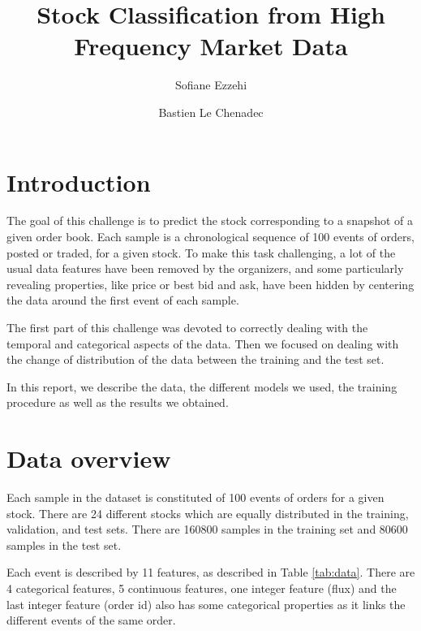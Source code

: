\documentclass[switch, 11pt]{article}
\title{Stock Classification from High Frequency Market Data}
\author[1]{Sofiane Ezzehi}
\author[1]{Bastien Le Chenadec}
\affil[1]{École des Ponts ParisTech, Master MVA}
\begin{document}
\maketitle

\begin{multicols}{2}
    \section{Introduction}

    The goal of this challenge is to predict the stock corresponding to a snapshot of a given order book. Each sample is a chronological sequence of 100 events of orders, posted or traded, for a given stock. To make this task challenging, a lot of the usual data features have been removed by the organizers, and some particularly revealing properties, like price or best bid and ask, have been hidden by centering the data around the first event of each sample.

    The first part of this challenge was devoted to correctly dealing with the temporal and categorical aspects of the data. Then we focused on dealing with the change of distribution of the data between the training and the test set.

    In this report, we describe the data, the different models we used, the training procedure as well as the results we obtained.

    \section{Data overview}

    Each sample in the dataset is constituted of 100 events of orders for a given stock. There are 24 different stocks which are equally distributed in the training, validation, and test sets. There are 160800 samples in the training set and 80600 samples in the test set.

    Each event is described by 11 features, as described in Table \ref{tab:data}. There are 4 categorical features, 5 continuous features, one integer feature (flux) and the last integer feature (order id) also has some categorical properties as it links the different events of the same order.


\end{multicols}
\end{document}
